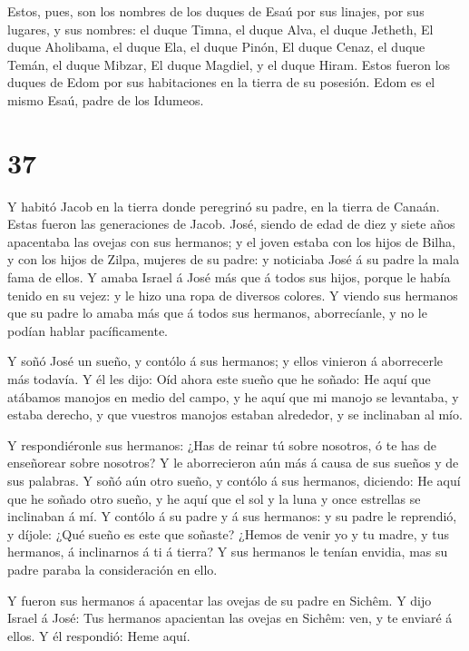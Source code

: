  Estos, pues, son los nombres de los duques de Esaú por sus
linajes, por sus lugares, y sus nombres: el duque Timna, el duque Alva,
el duque Jetheth,  El duque Aholibama, el duque Ela, el
duque Pinón,  El duque Cenaz, el duque Temán, el duque
Mibzar,  El duque Magdiel, y el duque Hiram. Estos fueron
los duques de Edom por sus habitaciones en la tierra de su posesión.
Edom es el mismo Esaú, padre de los Idumeos.

\hypertarget{section-36}{%
\section{37}\label{section-36}}

 Y habitó Jacob en la tierra donde peregrinó su padre, en la
tierra de Canaán.  Estas fueron las generaciones de Jacob.
José, siendo de edad de diez y siete años apacentaba las ovejas con sus
hermanos; y el joven estaba con los hijos de Bilha, y con los hijos de
Zilpa, mujeres de su padre: y noticiaba José á su padre la mala fama de
ellos.  Y amaba Israel á José más que á todos sus hijos,
porque le había tenido en su vejez: y le hizo una ropa de diversos
colores.  Y viendo sus hermanos que su padre lo amaba más
que á todos sus hermanos, aborrecíanle, y no le podían hablar
pacíficamente.

 Y soñó José un sueño, y contólo á sus hermanos; y ellos
vinieron á aborrecerle más todavía.  Y él les dijo: Oíd
ahora este sueño que he soñado:  He aquí que atábamos
manojos en medio del campo, y he aquí que mi manojo se levantaba, y
estaba derecho, y que vuestros manojos estaban alrededor, y se
inclinaban al mío.

 Y respondiéronle sus hermanos: ¿Has de reinar tú sobre
nosotros, ó te has de enseñorear sobre nosotros? Y le aborrecieron aún
más á causa de sus sueños y de sus palabras.  Y soñó aún
otro sueño, y contólo á sus hermanos, diciendo: He aquí que he soñado
otro sueño, y he aquí que el sol y la luna y once estrellas se
inclinaban á mí.  Y contólo á su padre y á sus hermanos: y
su padre le reprendió, y díjole: ¿Qué sueño es este que soñaste? ¿Hemos
de venir yo y tu madre, y tus hermanos, á inclinarnos á ti á tierra?
 Y sus hermanos le tenían envidia, mas su padre paraba la
consideración en ello.

 Y fueron sus hermanos á apacentar las ovejas de su padre
en Sichêm.  Y dijo Israel á José: Tus hermanos apacientan
las ovejas en Sichêm: ven, y te enviaré á ellos. Y él respondió: Heme
aquí.

